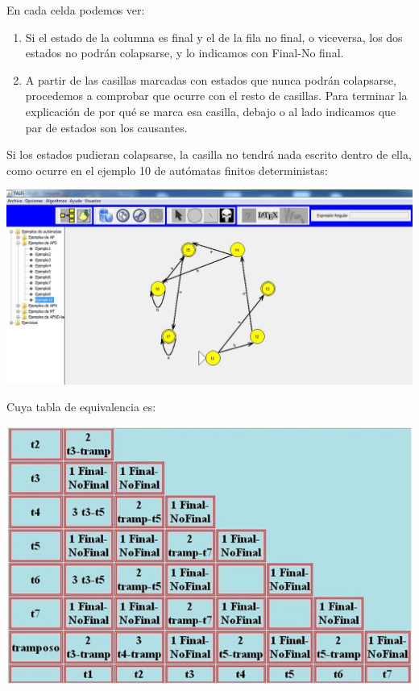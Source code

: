 \documentclass[12pt,a4paper,spanish]{book}
\begin{document}
En cada celda podemos ver:
\begin{enumerate}
\item Si el estado de la columna es final y el de la fila no final, o viceversa, los dos estados no podr\'an colapsarse, y lo indicamos con Final-No final.
\item A partir de las casillas marcadas con estados que nunca podr\'an colapsarse, procedemos a comprobar que ocurre con el resto de casillas. Para terminar la explicaci\'on de por qu\'e se marca esa casilla, debajo o al lado indicamos que par de estados son los causantes.
\end{enumerate}

Si los estados pudieran colapsarse, la casilla no tendr\'a nada escrito dentro de ella, como ocurre en el ejemplo 10 de aut\'omatas finitos deterministas:
\begin{center}
\includegraphics[width=\textwidth]{auto2.jpg}\\
\end{center}

Cuya tabla de equivalencia es:
\begin{center}
\includegraphics[width=\textwidth]{tabla2.jpg}\\
\end{center}
\end{document}
